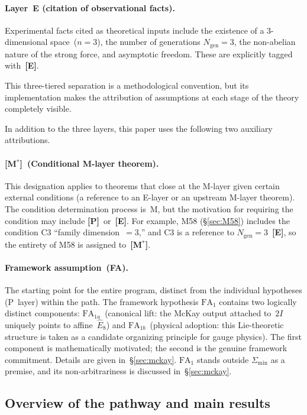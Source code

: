 \documentclass[sn-mathphys-num,Numbered]{sn-jnl}
\theoremstyle{thmstyleone}
\theoremstyle{thmstylethree}
\newcommand{\Amin}{\Sigma_{\min}}
\newcommand{\Ngen}{N_{\mathrm{gen}}}
\newcommand{\Ehat}{\hat{E}}
\newcommand{\layerP}{\textbf{[P]}}
\newcommand{\layerE}{\textbf{[E]}}
\newcommand{\layerMs}{\textbf{[M$^*$]}}
\begin{document}
\paragraph{Layer~E (citation of observational facts).}
Experimental facts cited as theoretical inputs include the existence of a
3-dimensional space~($n=3$), the number of generations $\Ngen = 3$, the
non-abelian nature of the strong force, and asymptotic freedom.  These are
explicitly tagged with~\layerE.

This three-tiered separation is a methodological convention, but its
implementation makes the attribution of assumptions at each stage of the theory
completely visible.

In addition to the three layers, this paper uses the following two auxiliary
attributions.

\paragraph{\layerMs\ (Conditional M-layer theorem).}
This designation applies to theorems that close at the M-layer given certain
external conditions (a reference to an E-layer or an upstream M-layer
theorem).  The condition determination process is~M, but the motivation for
requiring the condition may include \layerP\ or~\layerE.  For example, M58
(\S\ref{sec:M58}) includes the condition C3 ``family dimension~$= 3$,'' and
C3 is a reference to $\Ngen = 3$~\layerE, so the entirety of M58 is assigned
to~\layerMs.

\paragraph{Framework assumption~(FA).}
The starting point for the entire program, distinct from the individual
hypotheses (P~layer) within the path.  The framework hypothesis
$\mathrm{FA}_1$ contains two logically distinct components:
$\mathrm{FA}_{1a}$~(canonical lift: the McKay output attached to~$2I$
uniquely points to affine~$\Ehat_8$) and
$\mathrm{FA}_{1b}$~(physical adoption: this Lie-theoretic structure is taken
as a candidate organizing principle for gauge physics).
The first component is mathematically motivated; the second is the genuine
framework commitment.  Details are given in~\S\ref{sec:mckay}.
$\mathrm{FA}_1$ stands outside $\Amin$ as a premise, and its
non-arbitrariness is discussed in~\S\ref{sec:mckay}.


\subsection{Overview of the pathway and main results}\label{sec:overview}
\end{document}
